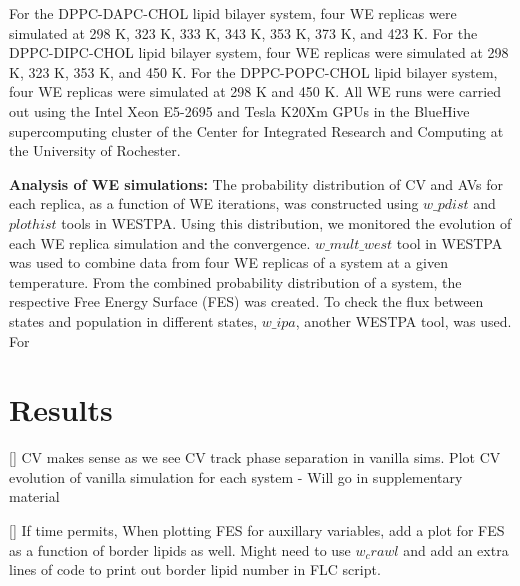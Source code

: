 \documentclass{biophys-new}
\begin{document}
For the DPPC-DAPC-CHOL lipid bilayer system, four WE replicas were simulated at 298 K, 323 K, 333 K, 343 K, 353 K, 373 K, and 423 K. 
For the DPPC-DIPC-CHOL lipid bilayer system, four WE replicas were simulated at 298 K, 323 K, 353 K, and 450 K. 
For the DPPC-POPC-CHOL lipid bilayer system, four WE replicas were simulated at 298 K and 450 K.
All WE runs were carried out using the Intel Xeon E5-2695 and Tesla K20Xm GPUs in the BlueHive supercomputing cluster of the Center for Integrated Research and
Computing at the University of Rochester.   

\textbf{Analysis of WE simulations:}
The probability distribution of CV and AVs for each replica, as a function of WE iterations, was constructed using $w\_pdist$ and $plothist$ tools in WESTPA.
Using this distribution, we monitored the evolution of each WE replica simulation and the convergence.
$w\_mult\_west$ tool in WESTPA was used to combine data from four WE replicas of a system at a given temperature.
From the combined probability distribution of a system, the respective Free Energy Surface (FES) was created.
To check the flux between states and population in different states, $w\_ipa$, another WESTPA tool, was used.
For 



\section*{Results}

[] CV makes sense as we see CV track phase separation in vanilla sims.
Plot CV evolution of vanilla simulation for each system - Will go in supplementary material

[] If time permits, When plotting FES for auxillary variables, add a plot for FES as a function of border lipids as well.
Might need to use $w_crawl$ and add an extra lines of code to print out border lipid number in FLC script.



\end{document}
